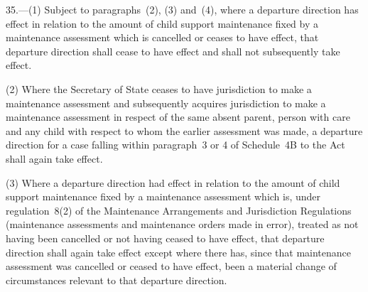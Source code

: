 \documentclass[12pt,a4paper]{article}
\begin{document}
35.—(1) Subject to paragraphs~(2), (3) and~(4), where a departure direction has effect in relation to the amount of child support maintenance fixed by a maintenance assessment which is cancelled or ceases to have effect, that departure direction shall cease to have effect and shall not subsequently take effect.

(2) Where 
the Secretary of State  %
ceases to have jurisdiction to make a maintenance assessment and subsequently acquires jurisdiction to make a maintenance assessment in respect of the same absent parent, person with care and any child with respect to whom the earlier assessment was made, a departure direction for a case falling within paragraph~3 or 4 of Schedule~4B to the Act shall again take effect. 

(3) Where a departure direction had effect in relation to the amount of child support maintenance fixed by a maintenance assessment which is, under regulation~8(2) of the Maintenance Arrangements and Jurisdiction Regulations (maintenance assessments and maintenance orders made in error), treated as not having been cancelled or not having ceased to have effect, that departure direction shall again take effect 
except where there has, since that maintenance assessment was cancelled or ceased to have effect, been a material change of circumstances relevant to that departure direction.
\end{document}
